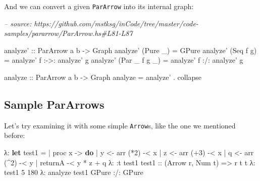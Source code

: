 \documentclass[]{article}
\newenvironment{Shaded}{}{}
\newcommand{\CommentTok}[1]{\textcolor[rgb]{0.38,0.63,0.69}{\textit{#1}}}
\newcommand{\DataTypeTok}[1]{\textcolor[rgb]{0.56,0.13,0.00}{#1}}
\newcommand{\DecValTok}[1]{\textcolor[rgb]{0.25,0.63,0.44}{#1}}
\newcommand{\FunctionTok}[1]{\textcolor[rgb]{0.02,0.16,0.49}{#1}}
\newcommand{\KeywordTok}[1]{\textcolor[rgb]{0.00,0.44,0.13}{\textbf{#1}}}
\newcommand{\NormalTok}[1]{#1}
\newcommand{\OtherTok}[1]{\textcolor[rgb]{0.00,0.44,0.13}{#1}}
\begin{document}
And we can convert a given \texttt{ParArrow} into its internal graph:

\begin{Shaded}
\begin{Highlighting}[]
\CommentTok{-- source: https://github.com/mstksg/inCode/tree/master/code-samples/pararrow/ParArrow.hs#L81-L87}

\OtherTok{analyze' ::} \DataTypeTok{ParArrow}\NormalTok{ a b }\OtherTok{->} \DataTypeTok{Graph}
\NormalTok{analyze' (}\DataTypeTok{Pure}\NormalTok{ _) }\FunctionTok{=} \DataTypeTok{GPure}
\NormalTok{analyze' (}\DataTypeTok{Seq}\NormalTok{ f g) }\FunctionTok{=}\NormalTok{ analyze' f }\FunctionTok{:->:}\NormalTok{ analyze' g}
\NormalTok{analyze' (}\DataTypeTok{Par}\NormalTok{ _ f g _) }\FunctionTok{=}\NormalTok{ analyze' f }\FunctionTok{:/:}\NormalTok{ analyze' g}

\OtherTok{analyze ::} \DataTypeTok{ParArrow}\NormalTok{ a b }\OtherTok{->} \DataTypeTok{Graph}
\NormalTok{analyze }\FunctionTok{=}\NormalTok{ analyze' }\FunctionTok{.}\NormalTok{ collapse}
\end{Highlighting}
\end{Shaded}

\hypertarget{sample-pararrows}{%
\subsection{Sample ParArrows}\label{sample-pararrows}}

Let's try examining it with some simple \texttt{Arrow}s, like the one we
mentioned before:

\begin{Shaded}
\begin{Highlighting}[]
\NormalTok{λ}\FunctionTok{:} \KeywordTok{let}\NormalTok{ test1 }\FunctionTok{=}
 \FunctionTok{|}\NormalTok{       proc x }\OtherTok{->} \KeywordTok{do}
 \FunctionTok{|}\NormalTok{       y }\OtherTok{<-}\NormalTok{ arr (}\FunctionTok{*}\DecValTok{2}\NormalTok{) }\FunctionTok{-<}\NormalTok{ x}
 \FunctionTok{|}\NormalTok{       z }\OtherTok{<-}\NormalTok{ arr (}\FunctionTok{+}\DecValTok{3}\NormalTok{) }\FunctionTok{-<}\NormalTok{ x}
 \FunctionTok{|}\NormalTok{       q }\OtherTok{<-}\NormalTok{ arr (}\FunctionTok{^}\DecValTok{2}\NormalTok{) }\FunctionTok{-<}\NormalTok{ y}
 \FunctionTok{|}\NormalTok{       returnA }\FunctionTok{-<}\NormalTok{ y }\FunctionTok{*}\NormalTok{ z }\FunctionTok{+}\NormalTok{ q}
\NormalTok{λ}\FunctionTok{:} \FunctionTok{:}\NormalTok{t test1}
\OtherTok{test1 ::}\NormalTok{ (}\DataTypeTok{Arrow}\NormalTok{ r, }\DataTypeTok{Num}\NormalTok{ t) }\OtherTok{=>}\NormalTok{ r t t}
\NormalTok{λ}\FunctionTok{:}\NormalTok{ test1 }\DecValTok{5}
\DecValTok{180}
\NormalTok{λ}\FunctionTok{:}\NormalTok{ analyze test1}
\DataTypeTok{GPure} \FunctionTok{:/:} \DataTypeTok{GPure}
\end{Highlighting}
\end{Shaded}
\end{document}
